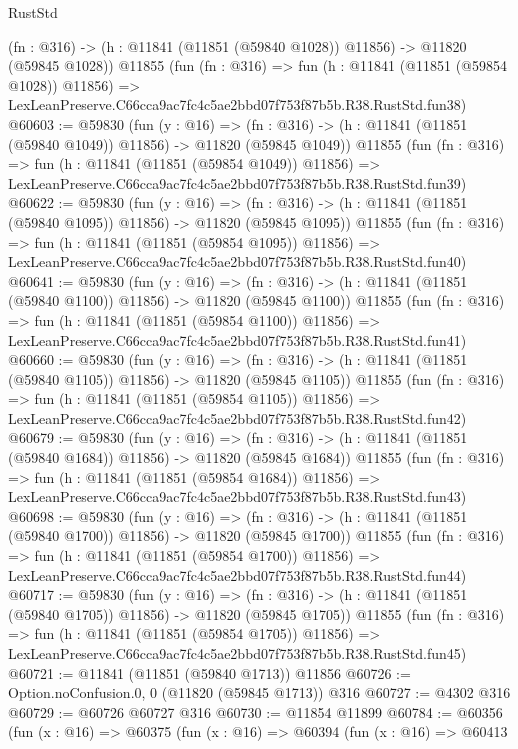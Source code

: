 \begin{lexlean}{RustStd}
\begin{coremodule}
    (fn : @316) -> (h : @11841 (@11851 (@59840 @1028)) @11856) -> @11820 (@59845 @1028))
    @11855
    (fun (fn : @316) =>
    fun (h : @11841 (@11851 (@59854 @1028)) @11856) =>
    LexLeanPreserve.C66cca9ac7fc4c5ae2bbd07f753f87b5b.R38.RustStd.fun38)
@60603 := @59830
    (fun (y : @16) =>
    (fn : @316) -> (h : @11841 (@11851 (@59840 @1049)) @11856) -> @11820 (@59845 @1049))
    @11855
    (fun (fn : @316) =>
    fun (h : @11841 (@11851 (@59854 @1049)) @11856) =>
    LexLeanPreserve.C66cca9ac7fc4c5ae2bbd07f753f87b5b.R38.RustStd.fun39)
@60622 := @59830
    (fun (y : @16) =>
    (fn : @316) -> (h : @11841 (@11851 (@59840 @1095)) @11856) -> @11820 (@59845 @1095))
    @11855
    (fun (fn : @316) =>
    fun (h : @11841 (@11851 (@59854 @1095)) @11856) =>
    LexLeanPreserve.C66cca9ac7fc4c5ae2bbd07f753f87b5b.R38.RustStd.fun40)
@60641 := @59830
    (fun (y : @16) =>
    (fn : @316) -> (h : @11841 (@11851 (@59840 @1100)) @11856) -> @11820 (@59845 @1100))
    @11855
    (fun (fn : @316) =>
    fun (h : @11841 (@11851 (@59854 @1100)) @11856) =>
    LexLeanPreserve.C66cca9ac7fc4c5ae2bbd07f753f87b5b.R38.RustStd.fun41)
@60660 := @59830
    (fun (y : @16) =>
    (fn : @316) -> (h : @11841 (@11851 (@59840 @1105)) @11856) -> @11820 (@59845 @1105))
    @11855
    (fun (fn : @316) =>
    fun (h : @11841 (@11851 (@59854 @1105)) @11856) =>
    LexLeanPreserve.C66cca9ac7fc4c5ae2bbd07f753f87b5b.R38.RustStd.fun42)
@60679 := @59830
    (fun (y : @16) =>
    (fn : @316) -> (h : @11841 (@11851 (@59840 @1684)) @11856) -> @11820 (@59845 @1684))
    @11855
    (fun (fn : @316) =>
    fun (h : @11841 (@11851 (@59854 @1684)) @11856) =>
    LexLeanPreserve.C66cca9ac7fc4c5ae2bbd07f753f87b5b.R38.RustStd.fun43)
@60698 := @59830
    (fun (y : @16) =>
    (fn : @316) -> (h : @11841 (@11851 (@59840 @1700)) @11856) -> @11820 (@59845 @1700))
    @11855
    (fun (fn : @316) =>
    fun (h : @11841 (@11851 (@59854 @1700)) @11856) =>
    LexLeanPreserve.C66cca9ac7fc4c5ae2bbd07f753f87b5b.R38.RustStd.fun44)
@60717 := @59830
    (fun (y : @16) =>
    (fn : @316) -> (h : @11841 (@11851 (@59840 @1705)) @11856) -> @11820 (@59845 @1705))
    @11855
    (fun (fn : @316) =>
    fun (h : @11841 (@11851 (@59854 @1705)) @11856) =>
    LexLeanPreserve.C66cca9ac7fc4c5ae2bbd07f753f87b5b.R38.RustStd.fun45)
@60721 := @11841 (@11851 (@59840 @1713)) @11856
@60726 := Option.noConfusion.{0, 0} (@11820 (@59845 @1713)) @316
@60727 := @4302 @316
@60729 := @60726 @60727 @316
@60730 := @11854 @11899
@60784 := @60356
    (fun (x : @16) =>
    @60375
      (fun (x : @16) =>
      @60394
        (fun (x : @16) =>
        @60413

\end{coremodule}
\end{lexlean}
